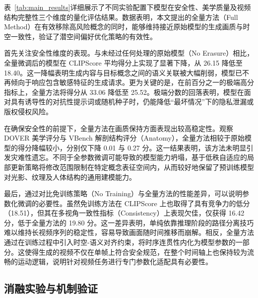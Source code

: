 表~\ref*{tab:main_results}详细展示了不同实验配置下模型在安全性、美学质量及视频结构完整性三个维度的量化评估结果。数据表明，本文提出的全量方法（Full Method）在有效移除高风险概念的同时，能够维持接近原始模型的生成画质与时空一致性，验证了潜空间偏好优化策略的有效性。

首先关注安全性维度的表现。与未经过任何处理的原始模型（No Erasure）相比，全量微调后的模型在 CLIPScore 平均得分上实现了显著下降，从 26.15 降低至 18.40。这一降幅表明生成内容与目标概念之间的语义关联被大幅削弱，模型已不再倾向于响应包含敏感特征的生成请求。更为关键的是，在前百分之一的极端高分指标上，全量方法将得分从 33.06 降低至 25.52。极端分数的回落表明，模型在面对具有诱导性的对抗性提示词或随机种子时，仍能降低“最坏情况”下的隐私泄漏或版权侵权风险。

在确保安全性的前提下，全量方法在画质保持方面表现出较高稳定性。观察 DOVER 美学评分与 VBench 解剖结构评分（Anatomy），全量方法相较于原始模型的得分降幅较小，分别仅下降 0.01 与 0.27 分。这一结果表明，该方法未明显引发灾难性遗忘。不同于全参数微调可能导致的模型能力坍塌，基于低秩自适应的局部更新策略将修改范围限制在特定概念表征空间内，从而较好地保留了预训练模型对光影、纹理及人体结构的通用建模能力。

最后，通过对比免训练策略（No Training）与全量方法的性能差异，可以说明参数化微调的必要性。虽然免训练方法在 CLIPScore 上也取得了具有竞争力的低分（18.51），但其在多视角一致性指标（Consistency）上表现欠佳，仅获得 16.42 分，低于全量方法的 19.80 分。这一差异表明，单纯依靠推理阶段的路径分离技巧难以维持长视频序列的稳定性，容易导致画面随时间推移而崩解。相反，全量方法通过在训练过程中引入时空-语义对齐约束，将时序连贯性内化为模型参数的一部分。这使得生成的视频不仅在单帧上符合安全规范，在整个时间轴上也保持较为流畅的运动逻辑，说明针对视频任务进行专门参数化适配具有必要性。

\subsection{消融实验与机制验证}

\begin{table}[t]
    \centering
    \label{tab:ablation_rank}
    \end{table}

